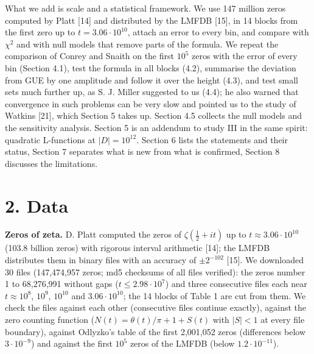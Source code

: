 \documentclass[
  10pt,
]{article}
\begin{document}
What we add is scale and a statistical framework. We use 147 million
zeros computed by Platt {[}14{]} and distributed by the LMFDB {[}15{]},
in 14 blocks from the first zero up to \(t = 3.06\cdot10^{10}\), attach
an error to every bin, and compare with \(\chi^2\) and with null models
that remove parts of the formula. We repeat the comparison of Conrey and
Snaith on the first \(10^5\) zeros with the error of every bin (Section
4.1), test the formula in all blocks (4.2), summarise the deviation from
GUE by one amplitude and follow it over the height (4.3), and test small
sets much further up, as S. J. Miller suggested to us (4.4); he also
warned that convergence in such problems can be very slow and pointed us
to the study of Watkins {[}21{]}, which Section 5 takes up. Section 4.5
collects the null models and the sensitivity analysis. Section 5 is an
addendum to study III in the same spirit: quadratic L-functions at
\(|D| = 10^{12}\). Section 6 lists the statements and their status,
Section 7 separates what is new from what is confirmed, Section 8
discusses the limitations.

\hypertarget{data}{%
\section{2. Data}\label{data}}

\textbf{Zeros of zeta.} D. Platt computed the zeros of
\(\zeta(\tfrac12 + it)\) up to \(t \approx 3.06\cdot10^{10}\) (103.8
billion zeros) with rigorous interval arithmetic {[}14{]}; the LMFDB
distributes them in binary files with an accuracy of \(\pm 2^{-102}\)
{[}15{]}. We downloaded 30 files (147,474,957 zeros; md5 checksums of
all files verified): the zeros number 1 to 68,276,991 without gaps
(\(t \le 2.98\cdot10^7\)) and three consecutive files each near
\(t \approx 10^8\), \(10^9\), \(10^{10}\) and \(3.06\cdot10^{10}\); the
14 blocks of Table 1 are cut from them. We check the files against each
other (consecutive files continue exactly), against the zero counting
function (\(N(t) = \theta(t)/\pi + 1 + S(t)\) with \(|S| < 1\) at every
file boundary), against Odlyzko's table of the first 2,001,052 zeros
(differences below \(3\cdot10^{-9}\)) and against the first \(10^5\)
zeros of the LMFDB (below \(1.2\cdot10^{-11}\)).
\end{document}
